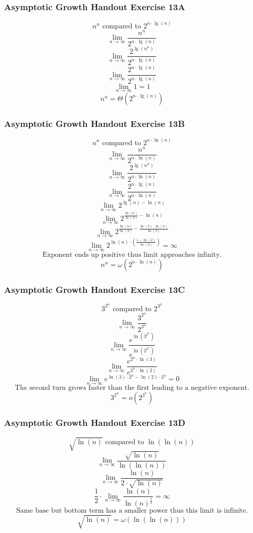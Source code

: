 \documentclass{article}
\begin{document}
\subsubsection{Asymptotic Growth Handout Exercise 13A}
$$n^n \text{ compared to } 2^{n\cdot \lg(n)}$$
$$\lim_{n \rightarrow \infty} \frac{n^n}{2^{n \cdot \lg(n)}}$$
$$\lim_{n \rightarrow \infty} \frac{2^{\lg(n^n)}}{2^{n \cdot \lg(n)}}$$
$$\lim_{n \rightarrow \infty} \frac{2^{n \cdot \lg(n)}}{2^{n \cdot \lg(n)}}$$
$$\lim_{n \rightarrow \infty} 1 = 1$$
$$n^n = \Theta(2^{n \cdot \lg(n)})$$

\subsubsection{Asymptotic Growth Handout Exercise 13B}
$$n^n \text{ compared to } 2^{n\cdot \ln(n)}$$
$$\lim_{n \rightarrow \infty} \frac{n^n}{2^{n \cdot \ln(n)}}$$
$$\lim_{n \rightarrow \infty} \frac{2^{\lg(n^n)}}{2^{n \cdot \ln(n)}}$$
$$\lim_{n \rightarrow \infty} \frac{2^{n \cdot \lg(n)}}{2^{n \cdot \ln(n)}}$$
$$\lim_{n \rightarrow \infty} 2^{\lg(n) - \ln(n)}$$
$$\lim_{n \rightarrow \infty} 2^{\frac{\ln(n)}{\ln(2)} - \ln(n)}$$
$$\lim_{n \rightarrow \infty} 2^{\frac{\ln(n)}{\ln(2)} - \frac{\ln(2) \cdot \ln(n)}{\ln(2)}} $$
$$\lim_{n \rightarrow \infty} 2^{\ln(n) \cdot (\frac{1 - \ln(2)}{\ln(2)})} = \infty$$
$$\text{Exponent ends up positive thus limit approaches infinity.}$$
$$n^n = \omega(2^{n\cdot \ln(n)})$$

\subsubsection{Asymptotic Growth Handout Exercise 13C}
$$3^{2^n} \text{ compared to } 2^{3^n}$$
$$\lim_{n \rightarrow \infty} \frac{3^{2^n}}{2^{3^n}} $$
$$\lim_{n \rightarrow \infty} \frac{e^{\ln(3^{2^n})}}{e^{\ln(2^{3^n})}}  $$
$$\lim_{n \rightarrow \infty} \frac{e^{2^n \cdot \ln(3)}}{e^{3^n \cdot \ln(2)}}  $$
$$\lim_{n \rightarrow \infty} e^{\ln(3) \cdot 2^n - \ln(2) \cdot 3^n} = 0$$
$$\text{The second turn grows faster than the first leading to a negative exponent.}$$
$$3^{2^n} = o(2^{3^n})$$

\subsubsection{Asymptotic Growth Handout Exercise 13D}
$$\sqrt{\ln(n)} \text{ compared to } \ln(\ln(n))$$
$$\lim_{n \rightarrow \infty} \frac{\sqrt{\ln(n)}}{\ln(\ln(n))} $$
$$\lim_{n \rightarrow \infty} \frac{\ln(n)}{2 \cdot\sqrt{\ln(n)}}$$
$$\frac{1}{2} \cdot \lim_{n \rightarrow \infty} \frac{\ln(n)}{\ln(n)^{\frac{1}{2}}} = \infty$$
$$\text{Same base but bottom term has a smaller power thus this limit is infinite.}$$
$$\sqrt{\ln(n)} = \omega(\ln(\ln(n)))$$
\end{document}
